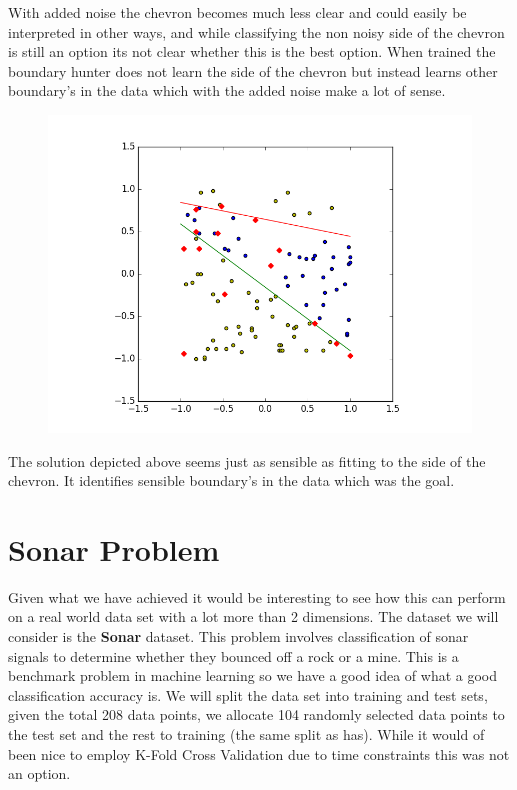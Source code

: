 \documentclass[notitlepage]{report}
\theoremstyle{definition}
\begin{document}
With added noise the chevron becomes much less clear and could easily be interpreted in other ways, and while classifying the non noisy side of the chevron is still an option its not clear whether this is the best option. When trained the boundary hunter does not learn the side of the chevron but instead learns other boundary's in the data which with the added noise make a lot of sense.

\begin{figure}[H]
  \centering
  \begin{minipage}[b]{0.8\textwidth}
    \includegraphics[width=\textwidth]{NoisyChev-BH-WithByas.png}
    \caption{}
  \end{minipage}
  \hfill
\end{figure}

The solution depicted above seems just as sensible as fitting to the side of the chevron. It identifies sensible boundary's in the data which was the goal.

\chapter{Sonar Problem}
Given what we have achieved it would be interesting to see how this can perform on a real world data set with a lot more than 2 dimensions. The dataset we will consider is the \textbf{Sonar} dataset. This problem involves classification of sonar signals to determine whether they bounced off a rock or a mine. This is a benchmark problem in machine learning so we have a good idea of what a good classification accuracy is. We will split the data set into training and test sets, given the total 208 data points, we allocate 104 randomly selected data points to the test set and the rest to training (the same split as \cite{gorman1988analysis} has). While it would of been nice to employ K-Fold Cross Validation due to time constraints this was not an option.\\
\end{document}
